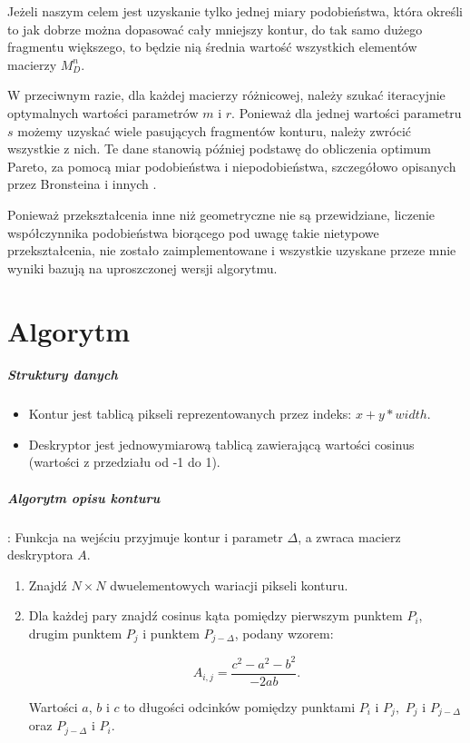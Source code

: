 Jeżeli naszym celem jest uzyskanie tylko jednej miary podobieństwa, która
określi to jak dobrze można dopasować cały mniejszy kontur, do tak samo dużego
fragmentu większego, to będzie nią średnia wartość wszystkich elementów
macierzy $M_{D}^{n}$.

W przeciwnym razie, dla każdej macierzy różnicowej, należy szukać iteracyjnie
optymalnych wartości parametrów $m$ i $r$. Ponieważ dla jednej wartości
parametru $s$ możemy uzyskać wiele pasujących fragmentów konturu, należy
zwrócić wszystkie z nich. Te dane stanowią później podstawę do obliczenia
optimum Pareto, za pomocą miar podobieństwa i niepodobieństwa, szczegółowo
opisanych przez Bronsteina i innych \cite{partial_similarity}.

Ponieważ przekształcenia inne niż geometryczne nie są przewidziane, liczenie
współczynnika podobieństwa biorącego pod uwagę takie nietypowe przekształcenia,
nie zostało zaimplementowane i wszystkie uzyskane przeze mnie wyniki bazują na
uproszczonej wersji algorytmu.

\section{Algorytm}

\subparagraph{Struktury danych} 

\begin{itemize} \item Kontur jest tablicą pikseli reprezentowanych przez
    indeks: $x + y*width$. \item Deskryptor jest jednowymiarową tablicą
    zawierającą wartości cosinus (wartości z przedziału od -1 do 1).
\end{itemize}

\subparagraph{Algorytm opisu konturu}: Funkcja na wejściu przyjmuje kontur i
parametr $\Delta$, a zwraca macierz deskryptora $A$.  

\begin{enumerate} \item Znajdź $N \times N$ dwuelementowych wariacji pikseli
    konturu. \item Dla każdej pary znajdź cosinus kąta pomiędzy pierwszym
    punktem $P_{i}$, drugim punktem $P_{j}$ i punktem $P_{j-\Delta}$, podany
    wzorem: 

\begin{equation}
  A_{i,j} = \frac{c^2 - a^2 - b^2}{-2ab}.
\end{equation}

 Wartości $a$, $b$ i $c$ to długości odcinków pomiędzy punktami $P_i$ i $P_j,$
 $P_j$ i $P_{j-\Delta}$ oraz $P_{j-\Delta}$ i $P_i$. \end{enumerate}

